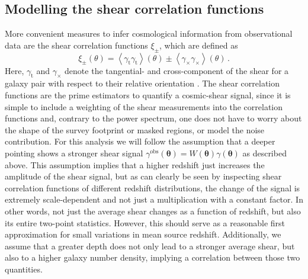 \documentclass{aa}
\renewcommand{\rm}{\mathrm}
\def\b#1{\bm{#1}}
\def\la{\left<}
\def\ra{\right>}
\begin{document}
\subsection{Modelling the shear correlation functions}
\label{sec:xipm_analytic}
More convenient measures to infer cosmological information from observational data are the shear correlation functions $\xi_\pm$, which are defined as \begin{equation}
\xi_\pm(\theta) = \la \gamma_{\rm t}\gamma_{\rm t}\ra(\theta) \pm \la \gamma_\times\gamma_\times\ra(\theta) \, .
\end{equation}
Here, $\gamma_{\rm{t}}$ and $\gamma_\times$ denote the tangential- and cross-component of the shear for a galaxy pair with respect to their relative orientation \citep[see][]{2002A&A...396....1S}.
The shear correlation functions are the prime estimators to quantify a cosmic-shear signal, since it is simple to include a weighting of the shear measurements into the correlation functions and, contrary to the power spectrum, one does not have to worry about the shape of the survey footprint or masked regions, or model the noise contribution. 
For this analysis we will follow the assumption that a deeper pointing shows a stronger shear signal $\gamma^{\rm{obs}}(\b\theta) = W(\b\theta)\gamma(\b\theta)$ as described above. This assumption implies that a higher redshift just increases the amplitude of the shear signal, but as can clearly be seen by inspecting shear correlation functions of different redshift distributions, the change of the signal is extremely scale-dependent and not just a multiplication with a constant factor. In other words, not just the average shear changes as a function of redshift, but also its entire two-point statistics. However, this should serve as a reasonable first approximation for small variations in mean source redshift. Additionally, we assume that a greater depth does not only lead to a stronger average shear, but also to a higher galaxy number density, implying a correlation between those two quantities.
\end{document}
